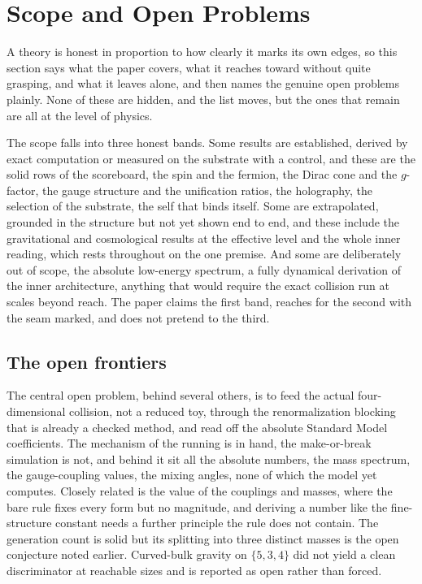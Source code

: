 \section{Scope and Open Problems}

A theory is honest in proportion to how clearly it marks its own edges, so this section says what the paper covers, what it reaches toward without quite grasping, and what it leaves alone, and then names the genuine open problems plainly. None of these are hidden, and the list moves, but the ones that remain are all at the level of physics.

The scope falls into three honest bands. Some results are established, derived by exact computation or measured on the substrate with a control, and these are the solid rows of the scoreboard, the spin and the fermion, the Dirac cone and the $g$-factor, the gauge structure and the unification ratios, the holography, the selection of the substrate, the self that binds itself. Some are extrapolated, grounded in the structure but not yet shown end to end, and these include the gravitational and cosmological results at the effective level and the whole inner reading, which rests throughout on the one premise. And some are deliberately out of scope, the absolute low-energy spectrum, a fully dynamical derivation of the inner architecture, anything that would require the exact collision run at scales beyond reach. The paper claims the first band, reaches for the second with the seam marked, and does not pretend to the third.

\subsection{The open frontiers}

The central open problem, behind several others, is to feed the actual four-dimensional collision, not a reduced toy, through the renormalization blocking that is already a checked method, and read off the absolute Standard Model coefficients. The mechanism of the running is in hand, the make-or-break simulation is not, and behind it sit all the absolute numbers, the mass spectrum, the gauge-coupling values, the mixing angles, none of which the model yet computes. Closely related is the value of the couplings and masses, where the bare rule fixes every form but no magnitude, and deriving a number like the fine-structure constant needs a further principle the rule does not contain. The generation count is solid but its splitting into three distinct masses is the open conjecture noted earlier. Curved-bulk gravity on $\{5,3,4\}$ did not yield a clean discriminator at reachable sizes and is reported as open rather than forced.

